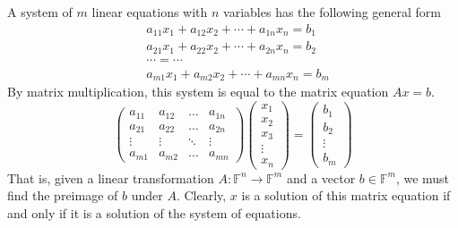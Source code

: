   A system of $m$ linear equations with $n$ variables has the following general form 
  \begin{align*}
    &a_{1 1} x_1 + a_{1 2} x_2 + \cdots + a_{1 n} x_n = b_1 \\
    &a_{2 1} x_1 + a_{2 2} x_2 + \cdots + a_{2 n} x_n = b_2 \\
    & \cdots = \cdots\\
    &a_{m 1} x_1 + a_{m 2} x_2 + \cdots + a_{m n} x_n = b_m
  \end{align*}
  By matrix multiplication, this system is equal to the matrix equation $A x = b$.
  \begin{equation}
    \begin{pmatrix}
     a_{1 1} & a_{1 2} & \ldots & a_{1 n} \\
     a_{2 1} & a_{2 2} & \ldots & a_{2 n} \\
     \vdots & \vdots & \ddots & \vdots \\
     a_{m 1} & a_{m 2} & \ldots & a_{m n} 
    \end{pmatrix} \begin{pmatrix}
     x_1 \\ x_2 \\ x_3 \\ \vdots \\ x_n
    \end{pmatrix} = \begin{pmatrix}
    b_1 \\ b_2 \\ \vdots \\ b_m
    \end{pmatrix}
  \end{equation}
  That is, given a linear transformation $A: \mathbb{F}^n \longrightarrow \mathbb{F}^m$ and a vector $b \in \mathbb{F}^m$, we must find the preimage of $b$ under $A$. Clearly, $x$ is a solution of this matrix equation if and only if it is a solution of the system of equations. 

